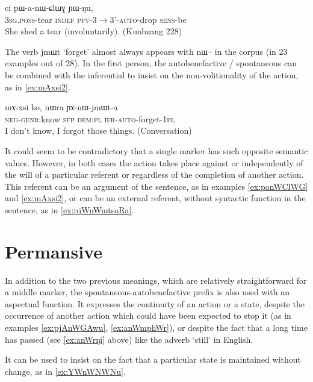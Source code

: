 \documentclass[oldfontcommands,oneside,a4paper,11pt]{article}
\newcommand{\ipa}[1]{{\phon \mbox{#1}}} %
\begin{document}
\begin{exe}
\ex \label{ex:panWClWG}
\gll \ipa{ɯ-qom} 	\ipa{ci} 	\ipa{pɯ-a-nɯ-ɕlɯɣ} 	\ipa{ɲɯ-ŋu,} \\
\textsc{3sg.poss}-tear \textsc{indef} \textsc{pfv-3$\rightarrow$3'-auto}-drop \textsc{sens}-be \\
\glt She shed a tear (involuntarily). (Kunbzang 228)
\end{exe}

The verb \ipa{jmɯt} `forget' almost always appears with \ipa{nɯ--} in the corpus (in 23 examples out of 28). In the first person, the autobenefactive / spontaneous can be combined with the inferential to insist on the non-volitionality of the action, as in  \ref{ex:mAxsi2}.

\begin{exe}
 \ex \label{ex:mAxsi2}
 \gll
\ipa{mɤ-xsi}  	\ipa{ko,}  	\ipa{nɯra}  	\ipa{ɲɤ-nɯ-jmɯt-a}  \\
\textsc{neg-genr}:know \textsc{sfp} \textsc{dem:pl} \textsc{ifr-auto}-forget-\textsc{1pl} \\
\glt I don't know, I forgot those things. (Conversation)
\end{exe}

It could seem to be contradictory that a single marker has such opposite semantic values. However, in both cases the action takes place against or independently of the will of a particular referent or regardless of the completion of another action. This referent can be an argument of the sentence, as in examples \ref{ex:panWClWG} and \ref{ex:mAxsi2}, or can be an external referent, without syntactic function in the sentence, as in \ref{ex:pjWnWmtsaRa}. 


 
 
\section{Permansive}
In addition to the two previous meanings, which are relatively straightforward for a middle marker, the spontaneous-autobenefactive prefix is also used with an aspectual function. It expresses the continuity of an action or a state, despite the occurrence of another action which could have been expected to stop it (as in examples \ref{ex:pjAnWGAwu}, \ref{ex:anWmphWr}), or despite the fact that a long time has passed (see \ref{ex:anWrŋi} above) like the adverb `still' in English. 

It can be used to insist on the fact  that a particular state is maintained without change, as in \ref{ex:YWnWNWNu}.
\end{document}
